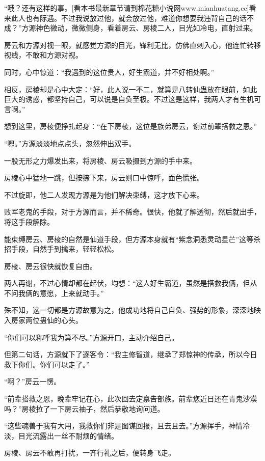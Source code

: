 
\begin{this_body}

“哦？还有这样的事。[看本书最新章节请到棉花糖小说网www.mianhuatang.cc]看来此人也有际遇。不过我说放过他，就会放过他，难道你想要我违背自己的话不成？”方源神色微动，微微侧身，看着房云、房棱二人，目光如冷电，直射过来。

房云和方源对视一眼，就感觉方源的目光，锋利无比，仿佛直刺入心，他连忙转移视线，不敢和方源对视。

同时，心中惊道：“我遇到的这位贵人，好生霸道，并不好相处啊。”

相反，房棱却是心中大定：“好，此人说一不二，就算是八转仙蛊放在眼前，如此巨大的诱惑，都坚持自己，可以说是自负至极。不过这是这样，我两人才有生机可言啊。”

想到这里，房棱便挣扎起身：“在下房棱，这位是族弟房云，谢过前辈搭救之恩。”

“嗯。”方源淡淡地点点头，忽然伸出双手。

一股无形之力爆发出来，将房棱、房云吸摄到方源的手中来。

房棱心中猛地一跳，但按捺下来，房云则口中惊呼，面色慌张。

不过旋即，他二人发现方源是为他们解决束缚，这才放下心来。

败军老鬼的手段，对于方源而言，并不稀奇。很快，他就了解透彻，然后就出手，将这手段解除。

能束缚房云、房棱的自然是仙道手段，但方源本身就有“紫念洞悉灵动星芒”这等杀招手段，自然手到擒来，轻轻松松。

房棱、房云很快就恢复自由。

两人再谢，不过心情却都在起伏，均想：“这人好生霸道，虽然是搭救我俩，但从不问我俩的意愿，上来就动手。”

殊不知，这一切都是方源故意为之，他成功地将自己自负、强势的形象，深深地映入房家两位蛊仙的心头。

“你们可以称呼我为算不尽。”方源开口，主动介绍自己。

但第二句话，方源就下了逐客令：“我主修智道，继承了郑惊神的传承，所以今日救下你们。你们可以走了。”

“啊？”房云一愣。

“前辈搭救之恩，晚辈牢记在心，此次回去定禀告部族。前辈您近日还在青鬼沙漠吗？”房棱拉了一下房云袖子，然后恭敬地询问道。

“这些魂兽于我有大用，我救你们非是图谋回报，且去且去。”方源挥手，神情冷淡，目光流露出一丝不耐烦的情绪。

房棱、房云不敢再打扰，一齐行礼之后，便转身飞走。


\end{this_body}
